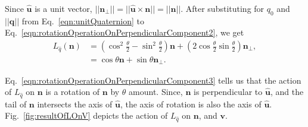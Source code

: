 Since $\boldsymbol{\hat u}$ is a unit vector, $||\boldsymbol{n}_\perp|| = ||\boldsymbol{\hat u} \times \boldsymbol{n}|| = ||\boldsymbol{n}||$. After substituting for $q_0$ and $||\boldsymbol{q}||$ from Eq.~\ref{eqn:unitQuaternion} to Eq.~\ref{eqn:rotationOperationOnPerpendicularComponent2}, we get
\begin{align}
    L_{\hat q}(\boldsymbol{n}) &= \left( \cos^2{\frac{\theta}{2}} - \sin^2{\frac{\theta}{2}} \right) \boldsymbol{n} + \left( 2 \cos{\frac{\theta}{2}} \sin{\frac{\theta}{2}} \right) \boldsymbol{n}_\perp, \\
    &= \cos{\theta} \boldsymbol{n} + \sin{\theta} \boldsymbol{n}_\perp.
    \label{eqn:rotationOperationOnPerpendicularComponent3}
\end{align}

Eq.~\ref{eqn:rotationOperationOnPerpendicularComponent3} tells us that the action of $L_{\hat q}$ on $\boldsymbol{n}$ is a rotation of $\boldsymbol{n}$ by $\theta$ amount. Since, $\boldsymbol{n}$ is perpendicular to $\boldsymbol{\hat u}$, and the tail of $\boldsymbol{n}$ intersects the axis of $\boldsymbol{\hat u}$, the axis of rotation is also the axis of $\boldsymbol{\hat u}$. Fig.~\ref{fig:resultOfLOnV} depicts the action of $L_{\hat q}$ on $\boldsymbol{n}$, and $\boldsymbol{v}$.

